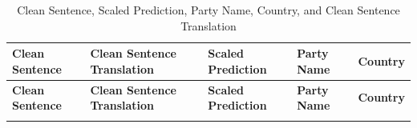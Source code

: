 \documentclass[12pt,letterpaper]{article}
\begin{document}
\begin{landscape}
	
	\begin{longtable}{|>{\centering\arraybackslash}m{7cm}|>{\centering\arraybackslash}m{7cm}|>{\centering\arraybackslash}m{2cm}|>{\centering\arraybackslash}m{2cm}|>{\centering\arraybackslash}m{2cm}|}
		\caption{Clean Sentence, Scaled Prediction, Party Name, Country, and Clean Sentence Translation} \\
		\hline
		\textbf{Clean Sentence} & \textbf{Clean Sentence Translation} & \textbf{Scaled Prediction} & \textbf{Party Name} & \textbf{Country} \\ \hline
		\endfirsthead
		
		\hline
		\textbf{Clean Sentence} & \textbf{Clean Sentence Translation} & \textbf{Scaled Prediction} & \textbf{Party Name} & \textbf{Country} \\ \hline
		\endhead
		
		\hline
		\endfoot
		
		\hline
		\endlastfoot
		

\end{longtable}
\end{landscape}
\end{document}
